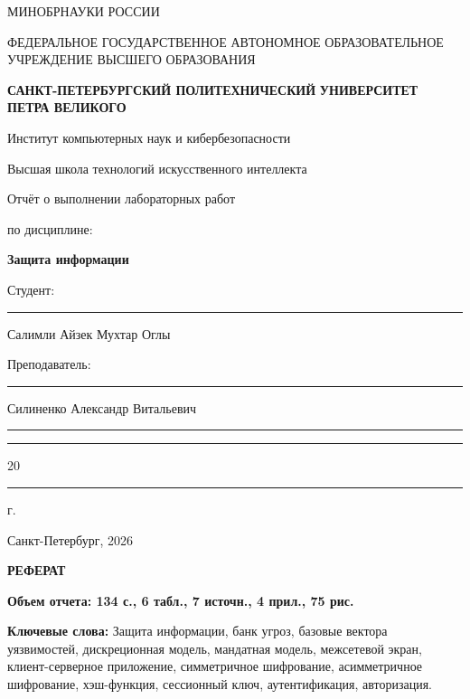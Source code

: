 \documentclass[areasetadvanced]{scrartcl}
\begin{document}
\sloppy
	\thispagestyle{empty}
	\begin{center}
		\large{МИНОБРНАУКИ РОССИИ} \par
		\vspace{0.3cm}
		\normalsize
		{ФЕДЕРАЛЬНОЕ ГОСУДАРСТВЕННОЕ АВТОНОМНОЕ ОБРАЗОВАТЕЛЬНОЕ УЧРЕЖДЕНИЕ ВЫСШЕГО ОБРАЗОВАНИЯ} \par
		\vspace{0.3cm}
		\textbf{САНКТ-ПЕТЕРБУРГСКИЙ ПОЛИТЕХНИЧЕСКИЙ}
		\textbf{УНИВЕРСИТЕТ ПЕТРА ВЕЛИКОГО} \par
		\vspace{0.3cm}
		{Институт компьютерных наук и кибербезопасности}\par
		{Высшая школа технологий искусственного интеллекта}\par
	\end{center}
	\vfill
	\begin{center}
		{\huge Отчёт о выполнении лабораторных работ}\par
        \huge {по дисциплине:}\par
        \vspace{0.3cm}
		\Huge \textbf{Защита информации}\par
	\end{center}
	\vfill
	\begin{flushleft}
		Студент: \hspace{1.8cm} \rule[0pt]{2.5cm}{0.5pt}\hfill Салимли Айзек Мухтар Оглы\par
		\vspace{1.5cm}
		Преподаватель: \hspace{0.55cm} \rule[0pt]{2.5cm}{0.5pt}\hfill  Силиненко Александр Витальевич
	\end{flushleft}
	\vspace{0.5cm}
	\begin{flushright}
		\guillemotleft \rule[0pt]{0.8cm}{0.5pt}\guillemotright \rule[0pt]{2cm}{0.5pt} 20\rule[0pt]{0.5cm}{0.5pt} г.
	\end{flushright}
	\vfill
	\begin{center}
		Санкт-Петербург, 2026
	\end{center}

\newpage
\begin{center}
	\textbf{РЕФЕРАТ}\par
    \textbf{Объем отчета: 134 с., 6 табл., 7 источн., 4 прил., 75 рис.}
\end{center}


\textbf{Ключевые слова:} Защита информации, банк угроз, базовые вектора уязвимостей, дискреционная модель, мандатная модель, межсетевой экран, клиент-серверное приложение, симметричное шифрование, асимметричное шифрование, хэш-функция, сессионный ключ, аутентификация, авторизация.
\end{document}
